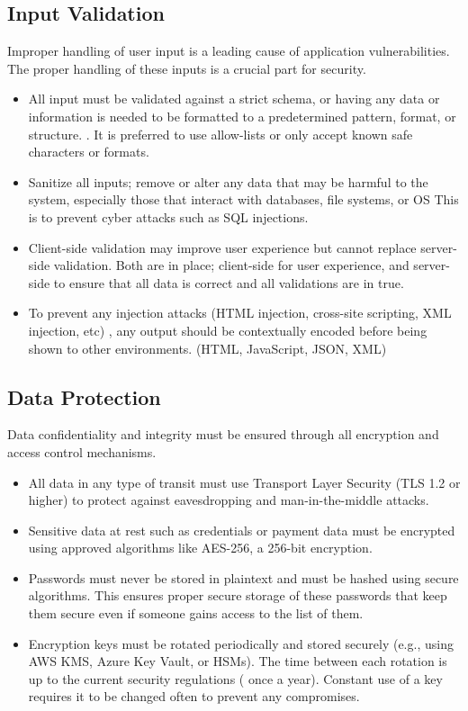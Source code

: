 \subsection{Input Validation}
Improper handling of user input is a leading cause of application vulnerabilities. The proper handling of these inputs is a crucial part for security.
\begin{itemize}
    \item All input must be validated against a strict schema, or having any data or information is needed to be formatted to a predetermined pattern, format, or structure. . It is preferred to use allow-lists or only accept known safe characters or formats. 
    \item Sanitize all inputs; remove or alter any data that may be harmful to the system, especially those that interact with databases, file systems, or OS This is to prevent cyber attacks such as SQL injections.
    \item Client-side validation may improve user experience but cannot replace server-side validation. Both are in place; client-side for user experience, and server-side to ensure that all data is correct and all validations are in true.
    \item To prevent any injection attacks (HTML injection, cross-site scripting, XML injection, etc) , any output should be contextually encoded before being shown to other environments.  (HTML, JavaScript, JSON, XML)

\end{itemize}

\subsection{Data Protection}
Data confidentiality and integrity must be ensured through all encryption and access control mechanisms.
\begin{itemize}
    \item All data in any type of transit must use Transport Layer Security (TLS 1.2 or higher) to protect against eavesdropping and man-in-the-middle attacks.
    \item Sensitive data at rest such as credentials or payment data must be encrypted using approved algorithms like AES-256, a 256-bit encryption.
    \item Passwords must never be stored in plaintext and must be hashed using secure algorithms. This ensures proper secure storage of these passwords that keep them secure even if someone gains access to the list of them.
    \item Encryption keys must be rotated periodically and stored securely (e.g., using AWS KMS, Azure Key Vault, or HSMs). The time between each rotation is up to the current security regulations ( once a year). Constant use of a key requires it to be changed often to prevent any compromises.
\end{itemize}

